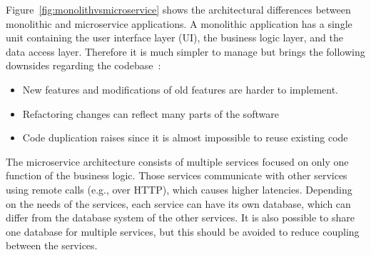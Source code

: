 Figure~\ref{fig:monolithvsmicroservice} shows the architectural differences between monolithic and microservice applications.
A monolithic application has a single unit containing the user interface layer (UI), the business logic layer, and the data access layer.
Therefore it is much simpler to manage but brings the following downsides regarding the codebase~\cite{kalske2017challenges}:
\begin{itemize}
    \item New features and modifications of old features are harder to implement.
    \item Refactoring changes can reflect many parts of the software
    \item Code duplication raises since it is almost impossible to reuse existing code
\end{itemize}
The microservice architecture consists of multiple services focused on only one function of the business logic.
Those services communicate with other services using remote calls (e.g., over HTTP), which causes higher latencies.
Depending on the needs of the services, each service can have its own database, which can differ from the database system of the other services.
It is also possible to share one database for multiple services, but this should be avoided to reduce coupling between the services. 

